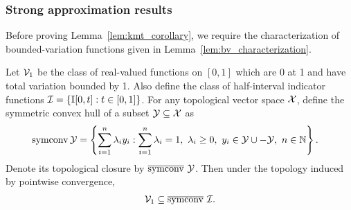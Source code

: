 \subsubsection{Strong approximation results}

Before proving Lemma~\ref{lem:kmt_corollary},
we require the characterization
of bounded-variation functions given in
Lemma~\ref{lem:bv_characterization}.

\begin{lemma}
  \label{lem:bv_characterization}

  Let $\mathcal{V}_1$ be
  the class of real-valued functions on $[0,1]$
  which are 0 at 1 and have total variation bounded by 1.
  Also define the class of
  half-interval indicator functions $\mathcal{I} = \{\mathbb{I}[0,t]: t \in [0,1]\}$.
  For any topological vector space $\mathcal{X}$,
  define the symmetric convex hull of a subset $\mathcal{Y} \subseteq \mathcal{X}$
  as
  \begin{align*}
    \operatorname{symconv} \mathcal{Y}
    &=
    \left\{
      \sum_{i=1}^n
      \lambda_i
      y_i :
      \sum_{i=1}^n
      \lambda_i
      = 1, \
      \lambda_i
      \geq 0, \
      y_i \in \mathcal{Y} \cup -\mathcal{Y}, \
      n \in \mathbb{N}
    \right\}.
  \end{align*}
  Denote its topological closure by
  $\overline{\operatorname{symconv}} \ \mathcal{Y}$.
  Then under the topology induced
  by pointwise convergence,
  \begin{align*}
    \mathcal{V}_1 \subseteq \overline{\operatorname{symconv}} \ \mathcal{I}.
  \end{align*}

\end{lemma}

